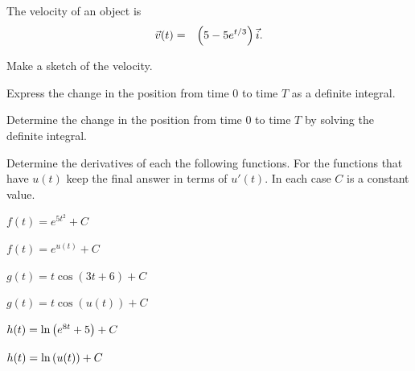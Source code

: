 \begin{problem}
\item The velocity of an object is
  \begin{eqnarray*}
    \vec{v}(t) & = & \left( 5 - 5 e^{t/3} \right) \vec{i}.
  \end{eqnarray*}
  \begin{subproblem}
  \item Make a sketch of the velocity.  
    \vfill
  \item Express the change in the position from time 0 to time $T$ as
    a definite integral.
    \vfill
  \item Determine the change in the position from time 0 to time $T$
    by solving the definite integral.
    \vfill
  \end{subproblem}
\end{problem}



\begin{problem}
\item Determine the derivatives of each the following functions. For
  the functions that have $u(t)$ keep the final answer in terms of
  $u'(t)$. In each case $C$ is a constant value.
  \begin{subproblem}
    \item $f(t) = e^{5t^2} + C$
      \vfill
    \item $f(t) = e^{u(t)} + C$
      \vfill
    \item $g(t) = t \cos(3t+6)  + C$
      \vfill
    \item $g(t) = t \cos(u(t))  + C$
      \vfill
    \item $h(t) = \ln\left( e^{8t} + 5 \right)  + C$
      \vfill
    \item $h(t) = \ln\left( u(t) \right)  + C$
      \vfill
  \end{subproblem}

\end{problem}


